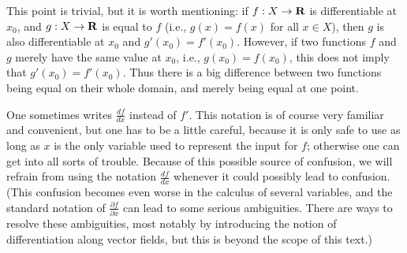 \setcounter{theorem}{3}
\begin{remark}\label{10.1.4}
    This point is trivial, but it is worth mentioning:
    if \(f : X \to \mathbf{R}\) is differentiable at \(x_0\), and \(g : X \to \mathbf{R}\) is equal to \(f\) (i.e., \(g(x) = f(x)\) for all \(x \in X\)), then \(g\) is also differentiable at \(x_0\) and \(g'(x_0) = f'(x_0)\).
    However, if two functions \(f\) and \(g\) merely have the same value at \(x_0\), i.e., \(g(x_0) = f(x_0)\), this does not imply that \(g'(x_0) = f'(x_0)\).
    Thus there is a big difference between two functions being equal on their whole domain, and merely being equal at one point.
\end{remark}

\begin{remark}\label{10.1.5}
    One sometimes writes \(\frac{df}{dx}\) instead of \(f'\).
    This notation is of course very familiar and convenient, but one has to be a little careful, because it is only safe to use as long as \(x\) is the only variable used to represent the input for \(f\);
    otherwise one can get into all sorts of trouble.
    Because of this possible source of confusion, we will refrain from using the notation \(\frac{df}{dx}\) whenever it could possibly lead to confusion.
    (This confusion becomes even worse in the calculus of several variables, and the standard notation of \(\frac{\partial f}{\partial x}\) can lead to some serious ambiguities.
    There are ways to resolve these ambiguities, most notably by introducing the notion of differentiation along vector fields, but this is beyond the scope of this text.)
\end{remark}

